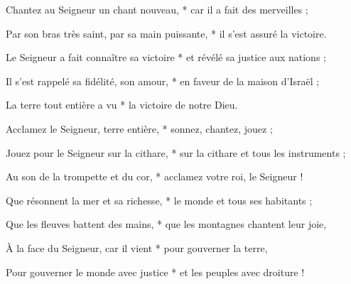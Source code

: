 \item Chantez au Seigneur un chant nouveau, * car il a fait des merveilles ; 
\item Par son bras très saint, par sa main puissante, * il s'est assuré la victoire.
\item Le Seigneur a fait connaître sa victoire * et révélé sa justice aux nations ;
\item Il s'est rappelé sa fidélité, son amour, * en faveur de la maison d'Israël ; 
\item La terre tout entière a vu * la victoire de notre Dieu.
\item Acclamez le Seigneur, terre entière, * sonnez, chantez, jouez ;
\item Jouez pour le Seigneur sur la cithare, * sur la cithare et tous les instruments ;
\item Au son de la trompette et du cor, * acclamez votre roi, le Seigneur !
\item Que résonnent la mer et sa richesse, * le monde et tous ses habitants ;
\item Que les fleuves battent des mains, * que les montagnes chantent leur joie,
\item À la face du Seigneur, car il vient * pour gouverner la terre,
\item Pour gouverner le monde avec justice * et les peuples avec droiture !
